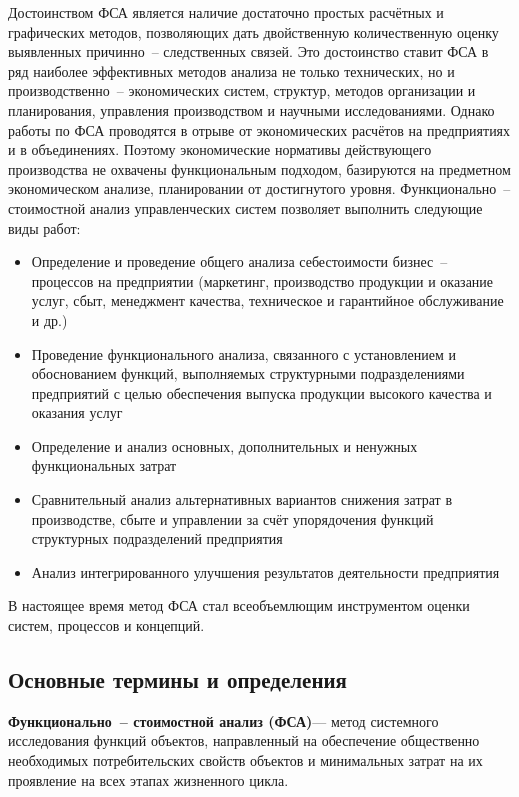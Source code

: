 Достоинством ФСА является наличие достаточно простых расчётных и графических
методов, позволяющих дать двойственную количественную оценку выявленных
причинно~-- следственных связей. Это достоинство ставит ФСА в ряд наиболее
эффективных методов анализа не только технических, но и
производственно~-- экономических систем, структур, методов организации и
планирования, управления производством и научными исследованиями. Однако работы
по ФСА проводятся в отрыве от экономических расчётов на предприятиях и в
объединениях.
Поэтому экономические нормативы действующего производства не охвачены
функциональным подходом, базируются на предметном экономическом анализе,
планировании от достигнутого уровня.
Функционально~-- стоимостной анализ управленческих систем позволяет выполнить
следующие виды работ:
\begin{itemize}
    \item Определение и проведение общего анализа себестоимости
    бизнес~-- процессов на предприятии (маркетинг, производство продукции и
    оказание услуг, сбыт, менеджмент качества, техническое и гарантийное
    обслуживание и др.)
    \item Проведение функционального анализа, связанного с установлением и
    обоснованием функций, выполняемых структурными подразделениями предприятий с
    целью обеспечения выпуска продукции высокого качества и оказания услуг
    \item Определение и анализ основных, дополнительных и ненужных
    функциональных затрат
    \item Сравнительный анализ альтернативных вариантов снижения затрат в
    производстве, сбыте и управлении за счёт упорядочения функций структурных
    подразделений предприятия
    \item Анализ интегрированного улучшения результатов деятельности
предприятия
\end{itemize}

В настоящее время метод ФСА стал всеобъемлющим инструментом
оценки систем, процессов и концепций.

\newpage
\subsection{Основные термины и определения}

\textbf{Функционально~-- стоимостной анализ (ФСА)}--- метод системного
исследования функций объектов, направленный на обеспечение общественно
необходимых потребительских свойств объектов и минимальных затрат на их
проявление на всех этапах жизненного цикла.

